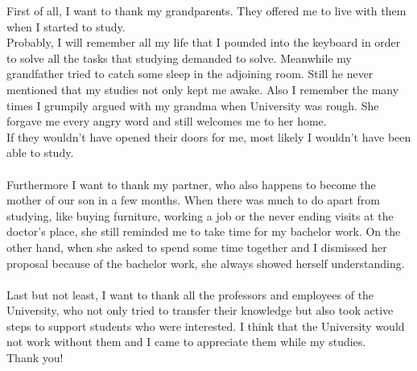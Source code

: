 \documentclass[draft,final]{vutinfth} %
\begin{document}
\begin{acknowledgements*}
First of all, I want to thank my grandparents. They offered me to live with them when I started to study.\\
Probably, I will remember all my life that I pounded into the keyboard in order to solve all the tasks that studying demanded to solve. Meanwhile my grandfather tried to catch some sleep in the adjoining room. Still he never mentioned that my studies not only kept me awake. Also I remember the many times I grumpily argued with my grandma when University was rough. She forgave me every angry word and still welcomes me to her home.\\
If they wouldn't have opened their doors for me, most likely I wouldn't have been able to study.\\
\\
Furthermore I want to thank my partner, who also happens to become the mother of our son in a few months. When there was much to do apart from studying, like buying furniture, working a job or the never ending visits at the doctor's place, she still reminded me to take time for my bachelor work. On the other hand, when she asked to spend some time together and I dismissed her proposal because of the bachelor work, she always showed herself understanding.\\
\\
Last but not least, I want to thank all the professors and employees of the University, who not only tried to transfer their knowledge but also took active steps to support students who were interested. I think that the University would not work without them and I came to appreciate them while my studies.\\
Thank you!
\end{acknowledgements*}

\begin{kurzfassung}
\end{kurzfassung}

\begin{abstract}
\end{abstract}


\tableofcontents %

\mainmatter
\end{document}
